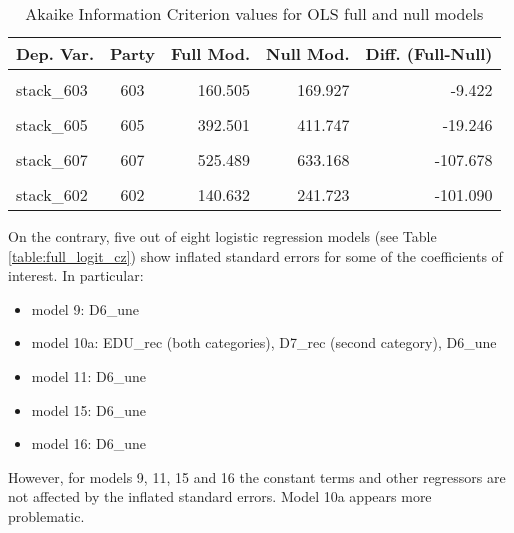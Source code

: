\documentclass[
]{article}
\providecommand{\tightlist}{%
  \setlength{\itemsep}{0pt}\setlength{\parskip}{0pt}}
\begin{document}
\begin{table}[!h]

\caption{\label{tab:unnamed-chunk-25}Akaike Information Criterion values for OLS full and null models 
        \label{table:ols_aic_cz}}
\centering
\begin{tabular}[t]{lcrrr}
\toprule
Dep. Var. & Party & Full Mod. & Null Mod. & Diff. (Full-Null)\\
\midrule
\cellcolor{gray!6}{stack\_601} & \cellcolor{gray!6}{601} & \cellcolor{gray!6}{52.665} & \cellcolor{gray!6}{237.851} & \cellcolor{gray!6}{-185.186}\\
stack\_603 & 603 & 160.505 & 169.927 & -9.422\\
\cellcolor{gray!6}{stack\_604} & \cellcolor{gray!6}{604} & \cellcolor{gray!6}{389.269} & \cellcolor{gray!6}{459.680} & \cellcolor{gray!6}{-70.412}\\
stack\_605 & 605 & 392.501 & 411.747 & -19.246\\
\cellcolor{gray!6}{stack\_606} & \cellcolor{gray!6}{606} & \cellcolor{gray!6}{745.102} & \cellcolor{gray!6}{803.107} & \cellcolor{gray!6}{-58.006}\\
\addlinespace
stack\_607 & 607 & 525.489 & 633.168 & -107.678\\
\cellcolor{gray!6}{stack\_608} & \cellcolor{gray!6}{608} & \cellcolor{gray!6}{459.283} & \cellcolor{gray!6}{468.756} & \cellcolor{gray!6}{-9.473}\\
stack\_602 & 602 & 140.632 & 241.723 & -101.090\\
\bottomrule
\end{tabular}
\end{table}

On the contrary, five out of eight logistic regression models (see Table \ref{table:full_logit_cz}) show
inflated standard errors for some of the coefficients of interest. In particular:

\begin{itemize}
\tightlist
\item
  model 9: D6\_une
\item
  model 10a: EDU\_rec (both categories), D7\_rec (second category), D6\_une
\item
  model 11: D6\_une
\item
  model 15: D6\_une
\item
  model 16: D6\_une
\end{itemize}

However, for models 9, 11, 15 and 16 the constant terms and other regressors are not affected by the inflated standard errors. Model 10a appears more problematic.
\end{document}
